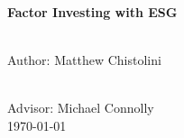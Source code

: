 \begin{titlepage}
\HRule \\[0.4cm]
{ \huge \bfseries Factor Investing with ESG}\\[0.4cm] %
\HRule \\[1.5cm]
 

\begin{minipage}{0.4\textwidth}
\begin{flushleft} \large
Author: \emph{}
Matthew Chistolini \textsc{}\\ %
\end{flushleft}

\end{minipage}\\[1cm]

 Advisor: \emph{}
Michael Connolly \textsc{}\\[2cm] %


{\large \today}\\[2cm] %

\vfill %

\end{titlepage}


